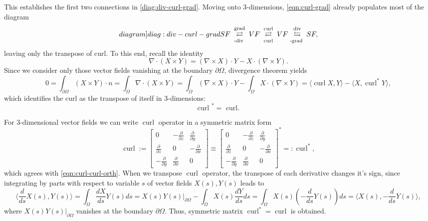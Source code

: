 \documentclass{article}
\numberwithin{equation}{section}
\begin{document}
This establishes the first two connections in \cref{diag:div-curl-grad}.
Moving onto 3-dimensions, \cref{eqn:curl-grad} already populates most of the diagram
\begin{equation}\label[diagram]{diag:div-curl-grad}
	S F \underset{\text {-div }}{\stackrel{\text { grad }}{\rightleftarrows}} V F \underset{\text { curl }}{\stackrel{\text { curl }}{\rightleftarrows}} V F \underset{\text {-grad }}{\stackrel{\text { div }}{\leftrightarrows}} S F,
\end{equation}
leaving only the transpose of curl. To this end, recall the identity
$$
\nabla \cdot(X \times Y)=(\nabla \times X) \cdot Y-X \cdot(\nabla \times Y).
$$
Since we consider only those vector fields vanishing at the boundary $\partial \Omega$, divergence theorem yields
$$
0=
\int_{\partial \Omega}(X \times Y) \cdot n
=\int_{\Omega} \nabla \cdot(X \times Y)
=\int_{\Omega} \left(\nabla \times X\right)\cdot Y 
	-\int_{\Omega} X \cdot \left(\nabla \times Y\right)
=\langle \operatorname{curl}X,Y\rangle-\langle X,\operatorname{curl}^*Y\rangle ,
$$
which identifies the curl as the transpose of itself in 3-dimensions:
\begin{equation}\label{eqn:curl-curl-orth}
\text { curl }^*=\text { curl. }	
\end{equation}


For 3-dimensional vector fields we can write $\operatorname{curl}$ operator in a symmetric matrix form
\begin{equation}\label{eqn:curl-transpose}
	\operatorname{curl}:=
	\begin{bmatrix}{}
  0& -\frac{\partial}{\partial z}&\frac{\partial}{\partial y} \\
  \frac{\partial}{\partial z}& 0 &-\frac{\partial }{\partial x} \\
  -\frac{\partial}{\partial y}&\frac{\partial }{\partial x} &0
\end{bmatrix}
\equiv\begin{bmatrix}{}
  0& -\frac{\partial}{\partial z}&\frac{\partial}{\partial y} \\
  \frac{\partial}{\partial z}& 0 &-\frac{\partial }{\partial x} \\
  -\frac{\partial}{\partial y}&\frac{\partial }{\partial x} &0
\end{bmatrix}^*=:\operatorname{curl}^*,
\end{equation}
which agrees with \cref{eqn:curl-curl-orth}. When we transpose $\operatorname{curl}$ operator, the transpose of each derivative changes it's sign, since integrating by parts with respect to variable $s$ of vector fields $X(s),Y(s)$ leads to
\begin{equation*}
\langle \frac{d}{ds}X(s),Y(s) \rangle=\int_{\Omega} \frac{d X}{d s} Y(s) d s=\left.X(s) Y(s)\right|_{\partial \Omega}-\int_{\Omega} X(s) \frac{d Y}{d s} d s=\int_{\Omega} X(s) \left(-\frac{d }{d s} Y(s)\right) d s=\langle X(s), -\frac{d}{ds} Y(s)\rangle,
\end{equation*}
where $\left.X(s) Y(s)\right|_{\partial \Omega}$ vanishes at the boundary $\partial\Omega$. Thus, symmetric matrix $\operatorname{curl}^*=\operatorname{curl}$ is obtained.
\end{document}
